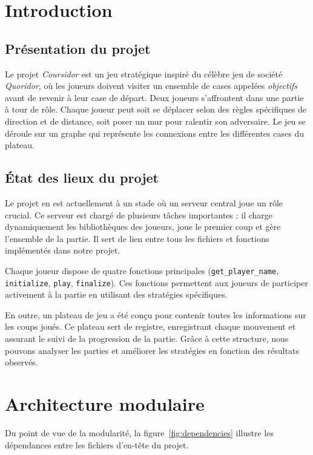 \section{Introduction}
\label{sec:part-dina}

\subsection{Présentation du projet}
Le projet \textit{Coursidor} est un jeu stratégique inspiré du célèbre jeu de société \textit{Quoridor}, où les joueurs doivent visiter un ensemble de cases appelées \textit{objectifs} avant de revenir à leur case de départ. Deux joueurs s’affrontent dans une partie à tour de rôle. Chaque joueur peut soit se déplacer selon des règles spécifiques de direction et de distance, soit poser un mur pour ralentir son adversaire. Le jeu se déroule sur un graphe qui représente les connexions entre les différentes cases du plateau.

\subsection{État des lieux du projet}
Le projet en est actuellement à un stade où un serveur central joue un rôle crucial. Ce serveur est chargé de plusieurs tâches importantes : il charge dynamiquement les bibliothèques des joueurs, joue le premier coup et gère l’ensemble de la partie. Il sert de lien entre tous les fichiers et fonctions implémentés dans notre projet.

Chaque joueur dispose de quatre fonctions principales (\texttt{get\_player\_name}, \texttt{initialize}, \texttt{play}, \texttt{finalize}). Ces fonctions permettent aux joueurs de participer activement à la partie en utilisant des stratégies spécifiques.

En outre, un plateau de jeu a été conçu pour contenir toutes les informations sur les coups joués. Ce plateau sert de registre, enregistrant chaque mouvement et assurant le suivi de la progression de la partie. Grâce à cette structure, nous pouvons analyser les parties et améliorer les stratégies en fonction des résultats observés.


\section{Architecture modulaire}

Du point de vue de la modularité, la figure~\ref{fig:dependencies} illustre les dépendances entre les fichiers d'en-tête du projet.

